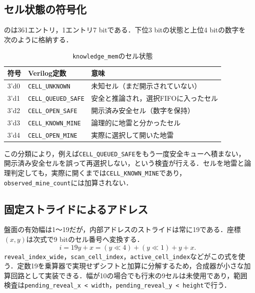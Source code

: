 \subsection{セル状態の符号化}

のは361エントリ，1エントリ7 bitである．下位3 bitの状態と上位4 bitの数字を次のように格納する．

\begin{table}[tb]
\centering
\caption{\texttt{knowledge\_mem}のセル状態}
\label{tab:solver-cell-state}
\begin{tabular}{lll}
\toprule
符号 & Verilog定数 & 意味\\
\midrule
3'd0 & \texttt{CELL\_UNKNOWN} & 未知セル（まだ開示されていない）\\
3'd1 & \texttt{CELL\_QUEUED\_SAFE} & 安全と推論され，選択FIFOに入ったセル\\
3'd2 & \texttt{CELL\_OPEN\_SAFE} & 開示済み安全セル（数字を保持）\\
3'd3 & \texttt{CELL\_KNOWN\_MINE} & 論理的に地雷と分かったセル\\
3'd4 & \texttt{CELL\_OPEN\_MINE} & 実際に選択して開いた地雷\\
\bottomrule
\end{tabular}
\end{table}

この分類により，例えば\texttt{CELL\_QUEUED\_SAFE}をもう一度安全キューへ積まない，開示済み安全セルを誤って再選択しない，という検査が行える．セルを地雷と論理判定しても，実際に開くまでは\texttt{CELL\_KNOWN\_MINE}であり，\texttt{observed\_mine\_count}には加算されない．

\subsection{固定ストライドによるアドレス}

盤面の有効幅は1〜19だが，内部アドレスのストライドは常に19である．座標$(x,y)$は次式で9 bitのセル番号へ変換する．
\begin{equation}
  i=19y+x=(y\mathbin{\ll}4)+(y\mathbin{\ll}1)+y+x.
  \label{eq:solver-stride}
\end{equation}
\texttt{reveal\_index\_wide}，\texttt{scan\_cell\_index}，\texttt{active\_cell\_index}などがこの式を使う．定数19を乗算器で実現せずシフトと加算に分解するため，合成器が小さな加算回路として実装できる．幅が10の場合でも行末の9セルは未使用であり，範囲検査は\texttt{pending\_reveal\_x < width}，\texttt{pending\_reveal\_y < height}で行う．

